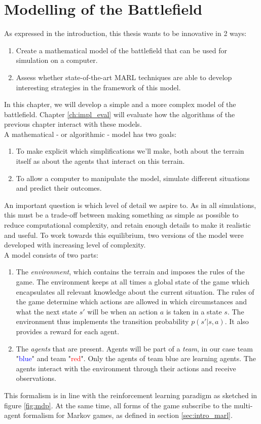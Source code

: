\chapter{Modelling of the Battlefield}
\label{ch:modelling}
As expressed in the introduction, this thesis wants to be innovative in 2 ways:
\begin{enumerate}
    \item Create a mathematical model of the battlefield that can be used for simulation on a computer.
    \item Assess whether state-of-the-art MARL techniques are able to develop interesting strategies in the framework of this model.
\end{enumerate}
In this chapter, we will develop a simple and a more complex model of the battlefield.  Chapter \ref{ch:impl_eval} will evaluate how the algorithms of the previous chapter interact with these models.\\
A mathematical - or algorithmic - model has two goals:
\begin{enumerate}
    \item To make explicit which simplifications we'll make, both about the terrain itself as about the agents that interact on this terrain.
    \item To allow a computer to manipulate the model, simulate different situations and predict their outcomes.
\end{enumerate}
An important question is which level of detail we aspire to. As in all simulations, this must be a trade-off between making something as simple as possible to reduce computational complexity, and retain enough details to make it realistic and useful. To work towards this equilibrium, two versions of the model were developed with increasing level of complexity.\\
A model consists of two parts:
\begin{enumerate}
    \item The \emph{environment}, which contains the terrain and imposes the rules of the game. The environment keeps at all times a global state of the game which encapsulates all relevant knowledge about the current situation. The rules of the game determine which actions are allowed in which circumstances and what the next state $s'$ will be when an action $a$ is taken in a state $s$. The environment thus implements the transition probability $p(s'|s, a)$. It also provides a reward for each agent.
    \item The \emph{agents} that are present. Agents will be part of a \emph{team}, in our case team "\textcolor{blue}{blue}" and team "\textcolor{red}{red}". Only the agents of team blue are learning agents. The agents interact with the environment through their actions and receive observations.
\end{enumerate}
This formalism is in line with the reinforcement learning paradigm as sketched in figure \ref{fig:mdp}. At the same time, all forms of the game subscribe to the multi-agent formalism for Markov games, as defined in section \ref{sec:intro_marl}.

